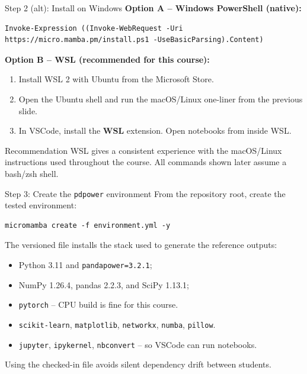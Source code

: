 \documentclass[aspectratio=169,10pt]{beamer}
\newcommand{\code}[1]{\texttt{#1}}
\begin{document}
\begin{frame}[fragile]{Step 2 (alt): Install on Windows}
\textbf{Option A -- Windows PowerShell (native):}
\begin{lstlisting}
Invoke-Expression ((Invoke-WebRequest -Uri https://micro.mamba.pm/install.ps1 -UseBasicParsing).Content)
\end{lstlisting}
\textbf{Option B -- WSL (recommended for this course):}
\begin{enumerate}
  \item Install WSL 2 with Ubuntu from the Microsoft Store.
  \item Open the Ubuntu shell and run the macOS/Linux one-liner from the previous slide.
  \item In VSCode, install the \textbf{WSL} extension. Open notebooks from inside WSL.
\end{enumerate}
\vspace{0.4em}
\begin{alertblock}{Recommendation}
WSL gives a consistent experience with the macOS/Linux instructions used throughout the course. All commands shown later assume a bash/zsh shell.
\end{alertblock}
\end{frame}

\begin{frame}[fragile]{Step 3: Create the \code{pdpower} environment}
From the repository root, create the tested environment:
\begin{lstlisting}
micromamba create -f environment.yml -y
\end{lstlisting}
\vspace{0.3em}
The versioned file installs the stack used to generate the reference outputs:
\begin{itemize}
  \item Python 3.11 and \code{pandapower=3.2.1};
  \item NumPy 1.26.4, pandas 2.2.3, and SciPy 1.13.1;
  \item \code{pytorch} -- CPU build is fine for this course.
  \item \code{scikit-learn}, \code{matplotlib}, \code{networkx}, \code{numba}, \code{pillow}.
  \item \code{jupyter}, \code{ipykernel}, \code{nbconvert} -- so VSCode can run notebooks.
\end{itemize}
Using the checked-in file avoids silent dependency drift between students.
\end{frame}
\end{document}
